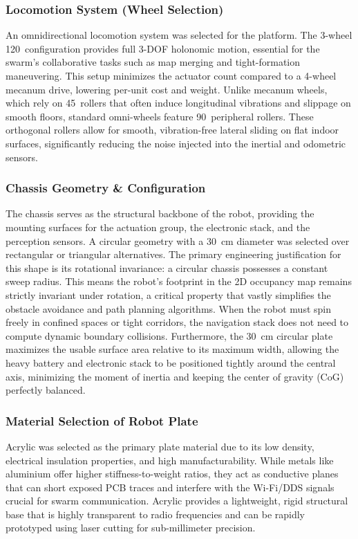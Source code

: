 \subsubsection{Locomotion System (Wheel Selection)}
An omnidirectional locomotion system was selected for the platform. The 3-wheel 120\degree\ configuration provides full 3-DOF holonomic motion, essential for the swarm's collaborative tasks such as map merging and tight-formation maneuvering. This setup minimizes the actuator count compared to a 4-wheel mecanum drive, lowering per-unit cost and weight. Unlike mecanum wheels, which rely on 45\degree\ rollers that often induce longitudinal vibrations and slippage on smooth floors, standard omni-wheels feature 90\degree\ peripheral rollers. These orthogonal rollers allow for smooth, vibration-free lateral sliding on flat indoor surfaces, significantly reducing the noise injected into the inertial and odometric sensors.


\subsubsection{Chassis Geometry \& Configuration}
The chassis serves as the structural backbone of the robot, providing the mounting surfaces for the actuation group, the electronic stack, and the perception sensors. A circular geometry with a 30~cm diameter was selected over rectangular or triangular alternatives. The primary engineering justification for this shape is its rotational invariance: a circular chassis possesses a constant sweep radius. This means the robot's footprint in the 2D occupancy map remains strictly invariant under rotation, a critical property that vastly simplifies the obstacle avoidance and path planning algorithms. When the robot must spin freely in confined spaces or tight corridors, the navigation stack does not need to compute dynamic boundary collisions. Furthermore, the 30~cm circular plate maximizes the usable surface area relative to its maximum width, allowing the heavy battery and electronic stack to be positioned tightly around the central axis, minimizing the moment of inertia and keeping the center of gravity (CoG) perfectly balanced.


\newpage

\subsubsection{Material Selection of Robot Plate}

Acrylic was selected as the primary plate material due to its low density, electrical insulation properties, and high manufacturability. While metals like aluminium offer higher stiffness-to-weight ratios, they act as conductive planes that can short exposed PCB traces and interfere with the Wi-Fi/DDS signals crucial for swarm communication. Acrylic provides a lightweight, rigid structural base that is highly transparent to radio frequencies and can be rapidly prototyped using laser cutting for sub-millimeter precision. 

